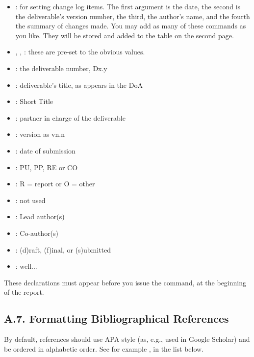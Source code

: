 \begin{itemize}
	\item {}: for setting change log items. The first argument is the date, the second is the deliverable's version number, the third, the author's name, and the   fourth the summary of changes made. You may add as many of these   commands as you like. They will be stored and added to the table on   the second page.  
	\item {}, , : these are pre-set to the obvious values. 
	\item {}: the deliverable number, Dx.y
	\item {}: deliverable's title, as appears in the DoA
	\item {}: Short Title
	\item {}: partner in charge of the deliverable
	\item {}: version as vn.n
	\item {}: date of submission
	\item {}: PU, PP, RE or CO
	\item {}: R = report or O = other
	\item {}: not used
	\item {}: Lead author(s)
	\item {}: Co-author(s)
	\item {}: (d)raft, (f)inal, or (s)ubmitted
	\item {}: well...
\end{itemize}

These declarations must appear before you issue the  command, at the beginning of the report.

\subsection*{A.7. Formatting Bibliographical References}
\label{sec:appendix-a7-formatting-bibliographical-references}

By default, references should use APA style (as, e.g., used in Google Scholar) and be ordered in alphabetic order. See for example \cite{bib:tan2004}, in the list below.

